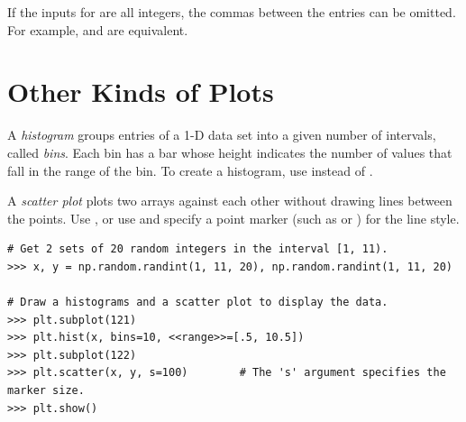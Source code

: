 If the inputs for  are all integers, the commas between the entries can be omitted.
For example,  and  are equivalent.

\section*{Other Kinds of Plots} %

A \emph{histogram} groups entries of a 1-D data set into a given number of intervals, called \emph{bins}.
Each bin has a bar whose height indicates the number of values that fall in the range of the bin.
To create a histogram, use  instead of .

A \emph{scatter plot} plots two arrays against each other without drawing lines between the points.
Use , or use  and specify a point marker (such as  or ) for the line style.

\begin{lstlisting}
# Get 2 sets of 20 random integers in the interval [1, 11).
>>> x, y = np.random.randint(1, 11, 20), np.random.randint(1, 11, 20)

# Draw a histograms and a scatter plot to display the data.
>>> plt.subplot(121)
>>> plt.hist(x, bins=10, <<range>>=[.5, 10.5])
>>> plt.subplot(122)
>>> plt.scatter(x, y, s=100)        # The 's' argument specifies the marker size.
>>> plt.show()
\end{lstlisting}

